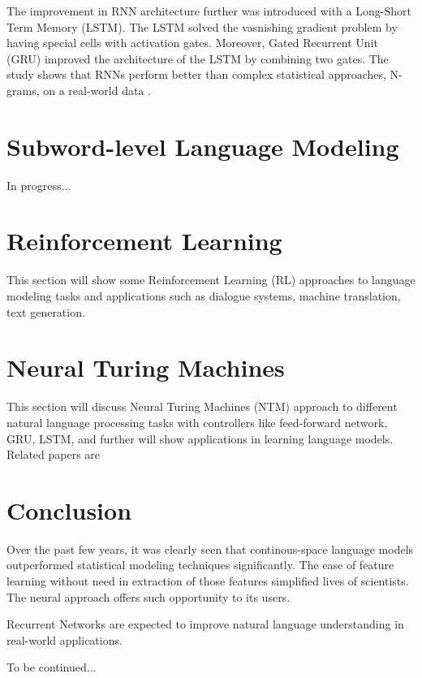 \documentclass{IEEEtran}
\begin{document}
The improvement in RNN architecture further was introduced with a Long-Short Term Memory (LSTM). The LSTM solved the vasnishing gradient problem by having special cells with activation gates. Moreover, Gated Recurrent Unit (GRU) improved the architecture of the LSTM by combining two gates. The study shows that RNNs perform better than complex statistical approaches, N-grams, on a real-world data \cite{rnn}.

\section{Subword-level Language Modeling}

In progress...

\section{Reinforcement Learning}

This section will show some Reinforcement Learning (RL) approaches to language modeling tasks and applications such as dialogue systems, machine translation, text generation.

\section{Neural Turing Machines}

This section will discuss Neural Turing Machines (NTM) approach to different natural language processing tasks with controllers like feed-forward network, GRU, LSTM, and further will show applications in learning language models. Related papers are \cite{snips16}

\section{Conclusion}

Over the past few years, it was clearly seen that continous-space language models outperformed statistical modeling techniques significantly. The ease of feature learning without need in extraction of those features simplified lives of scientists. The neural approach offers such opportunity to its users.

Recurrent Networks are expected to improve natural language understanding in real-world applications.

To be continued...




\printbibliography
\end{document}
